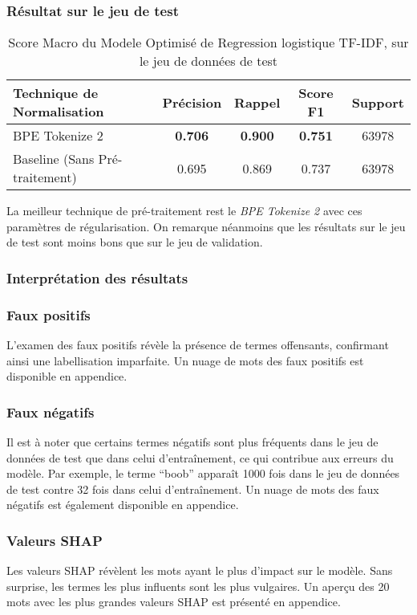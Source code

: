 \subsubsection{Résultat sur le jeu de test}
\begin{table}[ht]
    \centering
    \caption{Score Macro du Modele Optimisé de Regression logistique TF-IDF, sur le jeu de données de test}
    \begin{tabular}{lcccc}
    \hline
    \textbf{Technique de Normalisation} & \textbf{Précision} & \textbf{Rappel} & \textbf{Score F1} & \textbf{Support} \\ \hline
    BPE Tokenize 2                          & \textbf{0.706}              & \textbf{0.900}           & \textbf{0.751}            & 63978            \\\hline
    Baseline (Sans Pré-traitement)           & 0.695              & 0.869           & 0.737             & 63978            \\ 
\end{tabular}
\label{tab:results}
\end{table}
La meilleur technique de pré-traitement rest le \textit{BPE Tokenize 2} avec ces paramètres de régularisation.
On remarque néanmoins que les résultats sur le jeu de test sont moins bons que sur le jeu de validation.

\subsubsection{Interprétation des résultats}
\subsubsection{Faux positifs}
L'examen des faux positifs révèle la présence de termes offensants, confirmant ainsi une labellisation imparfaite. 
Un nuage de mots des faux positifs est disponible en appendice.

\subsubsection{Faux négatifs}
Il est à noter que certains termes négatifs sont plus fréquents dans le jeu de données de test que dans celui d'entraînement, ce qui contribue aux erreurs du modèle.
Par exemple, le terme ``boob'' apparaît 1000 fois dans le jeu de données de test contre 32 fois dans celui d'entraînement. 
Un nuage de mots des faux négatifs est également disponible en appendice.

\subsubsection{Valeurs SHAP}
Les valeurs SHAP révèlent les mots ayant le plus d'impact sur le modèle. 
Sans surprise, les termes les plus influents sont les plus vulgaires. 
Un aperçu des 20 mots avec les plus grandes valeurs SHAP est présenté en appendice.

